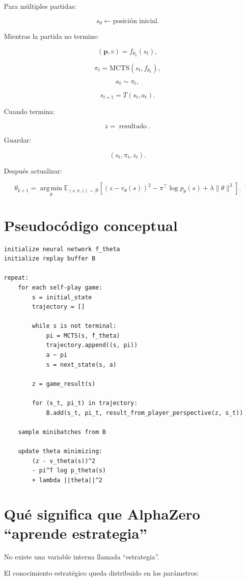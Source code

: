 \documentclass[11pt,a4paper]{article}
\newcommand{\E}{\mathbb{E}}
\newcommand{\argmin}{\operatorname*{arg\,min}}
\begin{document}
Para múltiples partidas:

\[
s_0\leftarrow\text{posición inicial}.
\]

Mientras la partida no termine:

\[
(\bm{p},v)=f_{\theta_k}(s_t),
\]

\[
\pi_t=\mathrm{MCTS}(s_t,f_{\theta_k}),
\]

\[
a_t\sim \pi_t,
\]

\[
s_{t+1}=T(s_t,a_t).
\]

Cuando termina:

\[
z=\operatorname{resultado}.
\]

Guardar:

\[
(s_t,\pi_t,z_t).
\]

Después actualizar:

\[
\theta_{k+1}
=
\argmin_\theta
\E_{(s,\pi,z)\sim\mathcal{B}}
\left[
(z-v_\theta(s))^2
-
\pi^\top\log p_\theta(s)
+
\lambda\|\theta\|^2
\right].
\]

\section{Pseudocódigo conceptual}

\begin{verbatim}
initialize neural network f_theta
initialize replay buffer B

repeat:
    for each self-play game:
        s = initial_state
        trajectory = []

        while s is not terminal:
            pi = MCTS(s, f_theta)
            trajectory.append((s, pi))
            a ~ pi
            s = next_state(s, a)

        z = game_result(s)

        for (s_t, pi_t) in trajectory:
            B.add(s_t, pi_t, result_from_player_perspective(z, s_t))

    sample minibatches from B

    update theta minimizing:
        (z - v_theta(s))^2
        - pi^T log p_theta(s)
        + lambda ||theta||^2
\end{verbatim}

\section{Qué significa que AlphaZero ``aprende estrategia''}

No existe una variable interna llamada ``estrategia''.

El conocimiento estratégico queda distribuido en los parámetros:
\end{document}

